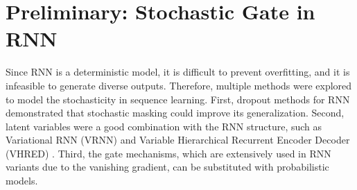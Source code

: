 \documentclass[letterpaper]{article} %
\begin{document}

\section{Preliminary: Stochastic Gate in RNN}
Since RNN is a deterministic model, it is difficult to prevent overfitting, and it is infeasible to generate diverse outputs. Therefore, multiple methods were explored to model the stochasticity in sequence learning. First, dropout methods for RNN \cite{gal2016theoretically,DBLP:journals/corr/abs-1904-09816} demonstrated that stochastic masking could improve its generalization. Second, latent variables were a good combination with the RNN structure, such as Variational RNN (VRNN) \cite{chung2015recurrent} and Variable Hierarchical Recurrent Encoder Decoder (VHRED) \cite{serban2017hierarchical}. Third, the gate mechanisms, which are extensively used in RNN variants due to the vanishing gradient, can be substituted with probabilistic models.
\end{document}
